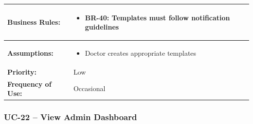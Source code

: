 \documentclass[12pt,a4paper]{article}
\begin{document}
\begin{longtable}{|p{4.5cm}|p{10.5cm}|}
\hline
\textbf{Business Rules:} &
\begin{itemize}
  \item BR-40: Templates must follow notification guidelines
\end{itemize} \\
\hline
\textbf{Assumptions:} &
\begin{itemize}
  \item Doctor creates appropriate templates
\end{itemize} \\
\hline
\textbf{Priority:} & Low \\
\hline
\textbf{Frequency of Use:} & Occasional \\
\hline
\end{longtable}

\subsubsection{UC-22 – View Admin Dashboard}
\end{document}
